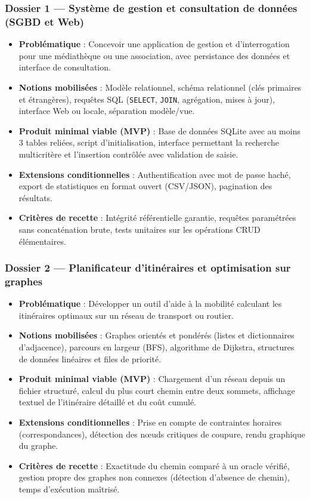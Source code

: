 \subsubsection*{Dossier 1 — Système de gestion et consultation de données (SGBD et Web)}
\begin{itemize}
  \item \textbf{Problématique} : Concevoir une application de gestion et d'interrogation pour une médiathèque ou une association, avec persistance des données et interface de consultation.
  \item \textbf{Notions mobilisées} : Modèle relationnel, schéma relationnel (clés primaires et étrangères), requêtes SQL (\texttt{SELECT}, \texttt{JOIN}, agrégation, mises à jour), interface Web ou locale, séparation modèle/vue.
  \item \textbf{Produit minimal viable (MVP)} : Base de données SQLite avec au moins 3 tables reliées, script d'initialisation, interface permettant la recherche multicritère et l'insertion contrôlée avec validation de saisie.
  \item \textbf{Extensions conditionnelles} : Authentification avec mot de passe haché, export de statistiques en format ouvert (CSV/JSON), pagination des résultats.
  \item \textbf{Critères de recette} : Intégrité référentielle garantie, requêtes paramétrées sans concaténation brute, tests unitaires sur les opérations CRUD élémentaires.
\end{itemize}

\subsubsection*{Dossier 2 — Planificateur d'itinéraires et optimisation sur graphes}
\begin{itemize}
  \item \textbf{Problématique} : Développer un outil d'aide à la mobilité calculant les itinéraires optimaux sur un réseau de transport ou routier.
  \item \textbf{Notions mobilisées} : Graphes orientés et pondérés (listes et dictionnaires d'adjacence), parcours en largeur (BFS), algorithme de Dijkstra, structures de données linéaires et files de priorité.
  \item \textbf{Produit minimal viable (MVP)} : Chargement d'un réseau depuis un fichier structuré, calcul du plus court chemin entre deux sommets, affichage textuel de l'itinéraire détaillé et du coût cumulé.
  \item \textbf{Extensions conditionnelles} : Prise en compte de contraintes horaires (correspondances), détection des nœuds critiques de coupure, rendu graphique du graphe.
  \item \textbf{Critères de recette} : Exactitude du chemin comparé à un oracle vérifié, gestion propre des graphes non connexes (détection d'absence de chemin), temps d'exécution maîtrisé.
\end{itemize}


